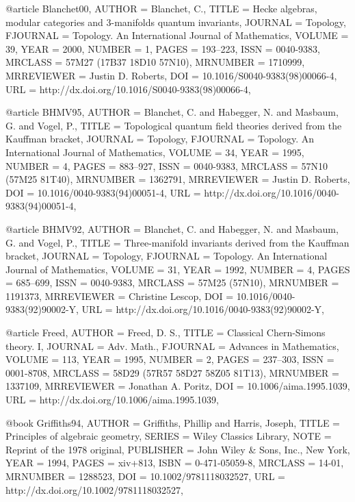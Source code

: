 @article {Blanchet00,
    AUTHOR = {Blanchet, C.},
     TITLE = {Hecke algebras, modular categories and {$3$}-manifolds quantum
              invariants},
   JOURNAL = {Topology},
  FJOURNAL = {Topology. An International Journal of Mathematics},
    VOLUME = {39},
      YEAR = {2000},
    NUMBER = {1},
     PAGES = {193--223},
      ISSN = {0040-9383},
   MRCLASS = {57M27 (17B37 18D10 57N10)},
  MRNUMBER = {1710999},
MRREVIEWER = {Justin D. Roberts},
       DOI = {10.1016/S0040-9383(98)00066-4},
       URL = {http://dx.doi.org/10.1016/S0040-9383(98)00066-4},
}


@article {BHMV95,
    AUTHOR = {Blanchet, C. and Habegger, N. and Masbaum, G. and Vogel, P.},
     TITLE = {Topological quantum field theories derived from the {K}auffman
              bracket},
   JOURNAL = {Topology},
  FJOURNAL = {Topology. An International Journal of Mathematics},
    VOLUME = {34},
      YEAR = {1995},
    NUMBER = {4},
     PAGES = {883--927},
      ISSN = {0040-9383},
   MRCLASS = {57N10 (57M25 81T40)},
  MRNUMBER = {1362791},
MRREVIEWER = {Justin D. Roberts},
       DOI = {10.1016/0040-9383(94)00051-4},
       URL = {http://dx.doi.org/10.1016/0040-9383(94)00051-4},
}

@article {BHMV92,
    AUTHOR = {Blanchet, C. and Habegger, N. and Masbaum, G. and Vogel, P.},
     TITLE = {Three-manifold invariants derived from the {K}auffman bracket},
   JOURNAL = {Topology},
  FJOURNAL = {Topology. An International Journal of Mathematics},
    VOLUME = {31},
      YEAR = {1992},
    NUMBER = {4},
     PAGES = {685--699},
      ISSN = {0040-9383},
   MRCLASS = {57M25 (57N10)},
  MRNUMBER = {1191373},
MRREVIEWER = {Christine Lescop},
       DOI = {10.1016/0040-9383(92)90002-Y},
       URL = {http://dx.doi.org/10.1016/0040-9383(92)90002-Y},
}

@article {Freed,
    AUTHOR = {Freed, D. S.},
     TITLE = {Classical {C}hern-{S}imons theory. {I}},
   JOURNAL = {Adv. Math.},
  FJOURNAL = {Advances in Mathematics},
    VOLUME = {113},
      YEAR = {1995},
    NUMBER = {2},
     PAGES = {237--303},
      ISSN = {0001-8708},
   MRCLASS = {58D29 (57R57 58D27 58Z05 81T13)},
  MRNUMBER = {1337109},
MRREVIEWER = {Jonathan A. Poritz},
       DOI = {10.1006/aima.1995.1039},
       URL = {http://dx.doi.org/10.1006/aima.1995.1039},
}



@book {Griffiths94,
    AUTHOR = {Griffiths, Phillip and Harris, Joseph},
     TITLE = {Principles of algebraic geometry},
    SERIES = {Wiley Classics Library},
      NOTE = {Reprint of the 1978 original},
 PUBLISHER = {John Wiley \& Sons, Inc., New York},
      YEAR = {1994},
     PAGES = {xiv+813},
      ISBN = {0-471-05059-8},
   MRCLASS = {14-01},
  MRNUMBER = {1288523},
       DOI = {10.1002/9781118032527},
       URL = {http://dx.doi.org/10.1002/9781118032527},
}
		
